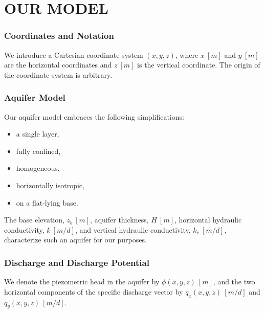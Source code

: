 \documentclass[12pt]{report}
\begin{document}
\chapter{OUR MODEL}
\subsection{Coordinates and Notation}\label{3.0.1}
We introduce a Cartesian coordinate system $(x,y,z)$, where $x~[m]$ and $y~[m]$ are the horizontal coordinates and $z~[m]$ is the vertical coordinate. The origin of the coordinate system is arbitrary.

\subsection{Aquifer Model}\label{3.0.2}
Our aquifer model embraces the following simplifications:
%
\begin{itemize}
    \item a single layer,
    \item fully confined,
    \item homogeneous,
    \item horizontally isotropic,
    \item on a flat-lying base.
\end{itemize}
%
The base elevation, $z_b~[m]$, aquifer thickness, $H~[m]$, horizontal hydraulic conductivity, $k~[m/d]$, and vertical hydraulic conductivity, $k_v~[m/d]$, characterize such an aquifer for our purposes.

\subsection{Discharge and Discharge Potential}\label{3.0.3}
We denote the piezometric head in the aquifer by $\phi(x,y,z)~[m]$, and the two horizontal components of the specific discharge vector by $q_x(x,y,z)~[m/d]$ and $q_y(x,y,z)~[m/d]$.
\end{document}
